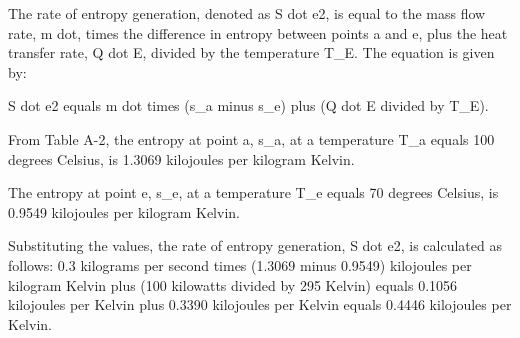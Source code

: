 The rate of entropy generation, denoted as S dot e2, is equal to the mass flow rate, m dot, times the difference in entropy between points a and e, plus the heat transfer rate, Q dot E, divided by the temperature T_E. The equation is given by:

S dot e2 equals m dot times (s_a minus s_e) plus (Q dot E divided by T_E).

From Table A-2, the entropy at point a, s_a, at a temperature T_a equals 100 degrees Celsius, is 1.3069 kilojoules per kilogram Kelvin.

The entropy at point e, s_e, at a temperature T_e equals 70 degrees Celsius, is 0.9549 kilojoules per kilogram Kelvin.

Substituting the values, the rate of entropy generation, S dot e2, is calculated as follows:
0.3 kilograms per second times (1.3069 minus 0.9549) kilojoules per kilogram Kelvin plus (100 kilowatts divided by 295 Kelvin) equals 0.1056 kilojoules per Kelvin plus 0.3390 kilojoules per Kelvin equals 0.4446 kilojoules per Kelvin.